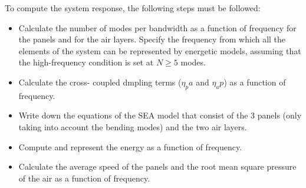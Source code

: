 To compute the system response, the following steps must be followed:
\begin{itemize}
\item Calculate the number of modes per bandwidth as a function of frequency for the panels and for the air layers. Specify the frequency from which all the elements of the system can be represented by energetic models, assuming that the high-frequency condition is set at $N \geq 5$ modes.
\item Calculate the cross- coupled dmpling terms ($\eta_pa$ and $\eta_ap$) as a function of frequency.
\item Write down the equations of the SEA model that consist of the 3 panels (only taking into account the bending modes) and the two air layers.
\item Compute and represent the energy  as a function of frequency.
\item Calculate the average speed of the panels and the root mean square pressure of the air as a function of frequency.
\end{itemize}


